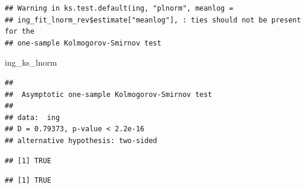 \documentclass[
]{article}
\newenvironment{Shaded}{\begin{snugshade}}{\end{snugshade}}
\newcommand{\AttributeTok}[1]{\textcolor[rgb]{0.13,0.29,0.53}{#1}}
\newcommand{\FloatTok}[1]{\textcolor[rgb]{0.00,0.00,0.81}{#1}}
\newcommand{\FunctionTok}[1]{\textcolor[rgb]{0.13,0.29,0.53}{\textbf{#1}}}
\newcommand{\NormalTok}[1]{#1}
\newcommand{\OtherTok}[1]{\textcolor[rgb]{0.56,0.35,0.01}{#1}}
\newcommand{\SpecialCharTok}[1]{\textcolor[rgb]{0.81,0.36,0.00}{\textbf{#1}}}
\newcommand{\StringTok}[1]{\textcolor[rgb]{0.31,0.60,0.02}{#1}}
\begin{document}
\begin{verbatim}
## Warning in ks.test.default(ing, "plnorm", meanlog =
## ing_fit_lnorm_rev$estimate["meanlog"], : ties should not be present for the
## one-sample Kolmogorov-Smirnov test
\end{verbatim}

\begin{Shaded}
\begin{Highlighting}[]
\NormalTok{ing\_ks\_lnorm}
\end{Highlighting}
\end{Shaded}

\begin{verbatim}
## 
##  Asymptotic one-sample Kolmogorov-Smirnov test
## 
## data:  ing
## D = 0.79373, p-value < 2.2e-16
## alternative hypothesis: two-sided
\end{verbatim}

\begin{Shaded}
\end{Shaded}

\begin{verbatim}
## [1] TRUE
\end{verbatim}

\begin{Shaded}
\end{Shaded}

\begin{verbatim}
## [1] TRUE
\end{verbatim}

\begin{Shaded}
\end{Shaded}
\end{document}
